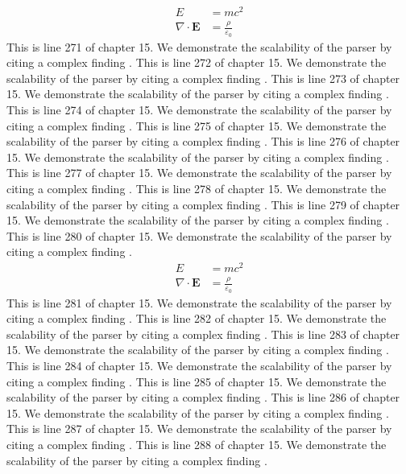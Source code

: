 \begin{align*}
  E &= mc^2 \\
  \nabla \cdot \mathbf{E} &= \frac{\rho}{\varepsilon_0}
\end{align*}
This is line 271 of chapter 15. We demonstrate the scalability of the parser by citing a complex finding \cite{ref15_271}.
This is line 272 of chapter 15. We demonstrate the scalability of the parser by citing a complex finding \cite{ref15_272}.
This is line 273 of chapter 15. We demonstrate the scalability of the parser by citing a complex finding \cite{ref15_273}.
This is line 274 of chapter 15. We demonstrate the scalability of the parser by citing a complex finding \cite{ref15_274}.
This is line 275 of chapter 15. We demonstrate the scalability of the parser by citing a complex finding \cite{ref15_275}.
This is line 276 of chapter 15. We demonstrate the scalability of the parser by citing a complex finding \cite{ref15_276}.
This is line 277 of chapter 15. We demonstrate the scalability of the parser by citing a complex finding \cite{ref15_277}.
This is line 278 of chapter 15. We demonstrate the scalability of the parser by citing a complex finding \cite{ref15_278}.
This is line 279 of chapter 15. We demonstrate the scalability of the parser by citing a complex finding \cite{ref15_279}.
This is line 280 of chapter 15. We demonstrate the scalability of the parser by citing a complex finding \cite{ref15_280}.
\begin{align*}
  E &= mc^2 \\
  \nabla \cdot \mathbf{E} &= \frac{\rho}{\varepsilon_0}
\end{align*}
This is line 281 of chapter 15. We demonstrate the scalability of the parser by citing a complex finding \cite{ref15_281}.
This is line 282 of chapter 15. We demonstrate the scalability of the parser by citing a complex finding \cite{ref15_282}.
This is line 283 of chapter 15. We demonstrate the scalability of the parser by citing a complex finding \cite{ref15_283}.
This is line 284 of chapter 15. We demonstrate the scalability of the parser by citing a complex finding \cite{ref15_284}.
This is line 285 of chapter 15. We demonstrate the scalability of the parser by citing a complex finding \cite{ref15_285}.
This is line 286 of chapter 15. We demonstrate the scalability of the parser by citing a complex finding \cite{ref15_286}.
This is line 287 of chapter 15. We demonstrate the scalability of the parser by citing a complex finding \cite{ref15_287}.
This is line 288 of chapter 15. We demonstrate the scalability of the parser by citing a complex finding \cite{ref15_288}.
